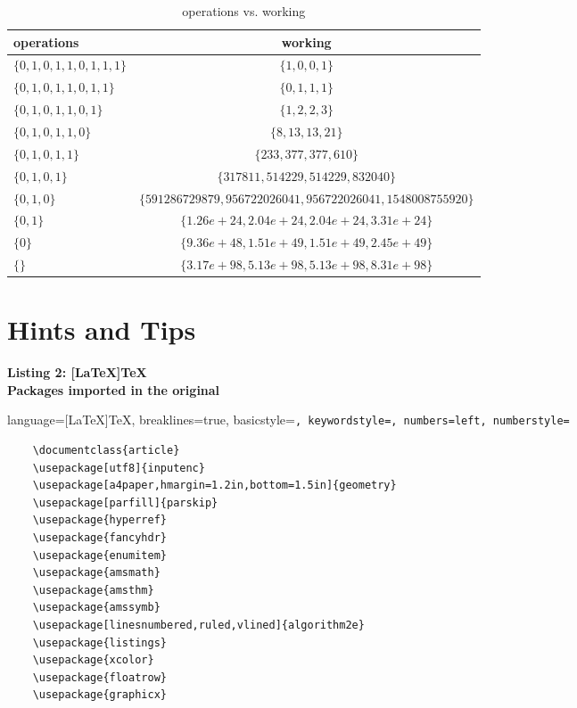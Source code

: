 \documentclass[10.8pt,oneside,reqno]{article}
\begin{document}
\begin{table}[h!]
    \begin{center}
      
      \label{table1}
      \begin{tabular}{l|c} 
        \textbf{operations} & \textbf{working} \\
        \hline
        $\{ 0, 1, 0, 1, 1, 0, 1, 1, 1 \}$ & $\{ 1, 0, 0, 1 \}$\\ 
        \hline
        $\{ 0, 1, 0, 1, 1, 0, 1, 1 \}$ & $\{ 0, 1, 1, 1 \}$ \\ 
        \hline
        $\{ 0, 1, 0, 1, 1, 0, 1 \}$ & $\{ 1, 2, 2, 3 \}$ \\ 
        \hline
        $\{ 0, 1, 0, 1, 1, 0 \}$ & $\{ 8, 13, 13, 21 \}$ \\ 
        \hline
        $\{ 0, 1, 0, 1, 1 \}$ & $\{ 233, 377, 377, 610 \}$ \\ 
        \hline
        $\{ 0, 1, 0, 1 \}$ & $\{317811, 514229, 514229, 832040 \}$ \\ 
        \hline %
        $\{ 0, 1, 0 \}$ & $\{591286729879, 956722026041, 956722026041, 1548008755920 \}$ \\ 
        \hline
        $\{ 0, 1\}$ & $\{ 1.26e+24, 2.04e+24, 2.04e+24, 3.31e+24 \}$ \\ 
        \hline
        $\{ 0 \}$ & $\{ 9.36e+48, 1.51e+49, 1.51e+49, 2.45e+49 \}$ \\ 
        \hline
        $\{ \}$ & $\{ 3.17e+98, 5.13e+98, 5.13e+98,8.31e+98 \}$ \\ 
        \hline
        
      \end{tabular}
      \caption{operations vs. working}
    \end{center}
  \end{table}
  
  \pagebreak
  
 
\section{Hints and Tips}
\label{Listing:2}
\begin{center}
    \textbf{\Large Listing 2: [LaTeX]TeX} \\
    \textbf{Packages imported in the original} \\
\end{center}
\lstset
{
    language=[LaTeX]TeX,
    breaklines=true,
    basicstyle=\tt\scriptsize,
    keywordstyle=\color{blue},
    numbers=left,
    numberstyle=\tiny\color{gray}
}
\begin{lstlisting}
    \documentclass{article}
    \usepackage[utf8]{inputenc}
    \usepackage[a4paper,hmargin=1.2in,bottom=1.5in]{geometry}
    \usepackage[parfill]{parskip}
    \usepackage{hyperref}
    \usepackage{fancyhdr}
    \usepackage{enumitem}
    \usepackage{amsmath}
    \usepackage{amsthm}
    \usepackage{amssymb}
    \usepackage[linesnumbered,ruled,vlined]{algorithm2e}
    \usepackage{listings}
    \usepackage{xcolor}
    \usepackage{floatrow}
    \usepackage{graphicx}
    
    
\end{lstlisting}
\end{document}
